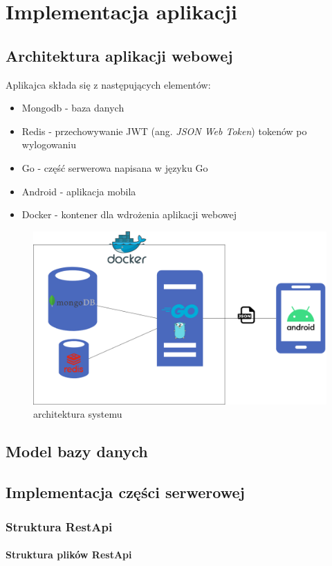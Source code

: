 \chapter{Implementacja aplikacji}
%
\section{Architektura aplikacji webowej}
Aplikajca składa się z następujących elementów:
\begin{itemize}
    \item Mongodb - baza danych
    \item Redis \cite{redis} - przechowywanie JWT (ang. \textit{JSON Web Token}) \cite{jwt} tokenów po wylogowaniu
    \item Go - część serwerowa napisana w języku Go
    \item Android - aplikacja mobila
    \item Docker - kontener dla wdrożenia aplikacji webowej
\end{itemize}
\begin{figure}[ht]
    \centering
        \includegraphics[width=0.8\linewidth]{rys03/system_architecture_diagram.png}
        \caption{architektura systemu \cite{diagrams_net}}
    \label{fig:system architecture diagram}
\end{figure}
\section{Model bazy danych}
\section{Implementacja części serwerowej}
\subsection{Struktura RestApi}
\subsubsection{Struktura plików RestApi}
